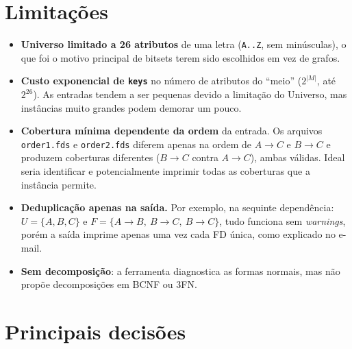 \documentclass[11pt,a4paper]{article}
\newcommand{\fd}[2]{\ensuremath{#1 \to #2}}
\newcommand{\cmd}[1]{\texttt{#1}}
\begin{document}
\section{Limitações}

\begin{itemize}
    \item \textbf{Universo limitado a 26 atributos} de uma letra
        (\texttt{A..Z}, sem minúsculas), o que foi o motivo principal de
        bitsets terem sido escolhidos em vez de grafos.

    \item \textbf{Custo exponencial de \cmd{keys}} no número de atributos do
        ``meio'' ($2^{|M|}$, até $2^{26}$). As entradas tendem a ser pequenas
        devido a limitação do Universo, mas instâncias muito grandes podem
        demorar um pouco.

    \item \textbf{Cobertura mínima dependente da ordem} da entrada.
        Os arquivos \texttt{order1.fds} e \texttt{order2.fds} diferem apenas na
        ordem de \fd{A}{C} e \fd{B}{C} e produzem coberturas diferentes
        (\fd{B}{C} contra \fd{A}{C}), ambas válidas. Ideal seria identificar
        e potencialmente imprimir todas as coberturas que a instância permite.

    \item \textbf{Deduplicação apenas na saída.} Por exemplo, na sequinte
        dependência: $U = \{A,B,C\}$ e $F = \{\fd{A}{B},\ \fd{B}{C},\ \fd{B}{C}\}$,
        tudo funciona sem \textit{warnings}, porém a saída imprime apenas uma vez
        cada FD única, como explicado no e-mail.

    \item \textbf{Sem decomposição}: a ferramenta diagnostica as formas normais,
        mas não propõe decomposições em BCNF ou 3FN.

\end{itemize}





\section{Principais decisões}
\end{document}
